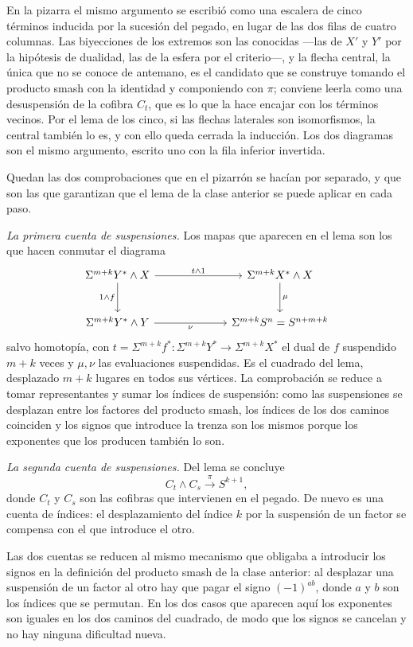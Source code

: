 En la pizarra el mismo argumento se escribió como una escalera de cinco términos inducida por la sucesión del pegado, en lugar de las dos filas de cuatro columnas. Las biyecciones de los extremos son las conocidas ---las de $X'$ y $Y'$ por la hipótesis de dualidad, las de la esfera por el criterio---, y la flecha central, la única que no se conoce de antemano, es el candidato que se construye tomando el producto smash con la identidad y componiendo con $\pi$; conviene leerla como una desuspensión de la cofibra $C_t$, que es lo que la hace encajar con los términos vecinos. Por el lema de los cinco, si las flechas laterales son isomorfismos, la central también lo es, y con ello queda cerrada la inducción. Los dos diagramas son el mismo argumento, escrito uno con la fila inferior invertida.

Quedan las dos comprobaciones que en el pizarrón se hacían por separado, y que son las que garantizan que el lema de la clase anterior se puede aplicar en cada paso.

\emph{La primera cuenta de suspensiones.} Los mapas que aparecen en el lema son los que hacen conmutar el diagrama
\[
\begin{tikzcd}[column sep=6.5em, row sep=large]
\Sigma^{m+k}Y^*\wedge X \arrow[r,"t\wedge1"] \arrow[d,"1\wedge f"'] & \Sigma^{m+k}X^*\wedge X \arrow[d,"\mu"]\\
\Sigma^{m+k}Y^*\wedge Y \arrow[r,"\nu"'] & \Sigma^{m+k}S^n=S^{n+m+k}
\end{tikzcd}
\]
salvo homotopía, con $t=\Sigma^{m+k}f^*\colon\Sigma^{m+k}Y^*\to\Sigma^{m+k}X^*$ el dual de $f$ suspendido $m+k$ veces y $\mu,\nu$ las evaluaciones suspendidas. Es el cuadrado del lema, desplazado $m+k$ lugares en todos sus vértices. La comprobación se reduce a tomar representantes y sumar los índices de suspensión: como las suspensiones se desplazan entre los factores del producto smash, los índices de los dos caminos coinciden y los signos que introduce la trenza son los mismos porque los exponentes que los producen también lo son.

\emph{La segunda cuenta de suspensiones.} Del lema se concluye
\[
C_t\wedge C_s\xrightarrow{\ \pi\ }S^{k+1},
\]
donde $C_t$ y $C_s$ son las cofibras que intervienen en el pegado. De nuevo es una cuenta de índices: el desplazamiento del índice $k$ por la suspensión de un factor se compensa con el que introduce el otro.

\begin{nota}
   Las dos cuentas se reducen al mismo mecanismo que obligaba a introducir los signos en la definición del producto smash de la clase anterior: al desplazar una suspensión de un factor al otro hay que pagar el signo $(-1)^{ab}$, donde $a$ y $b$ son los índices que se permutan. En los dos casos que aparecen aquí los exponentes son iguales en los dos caminos del cuadrado, de modo que los signos se cancelan y no hay ninguna dificultad nueva.
\end{nota}

